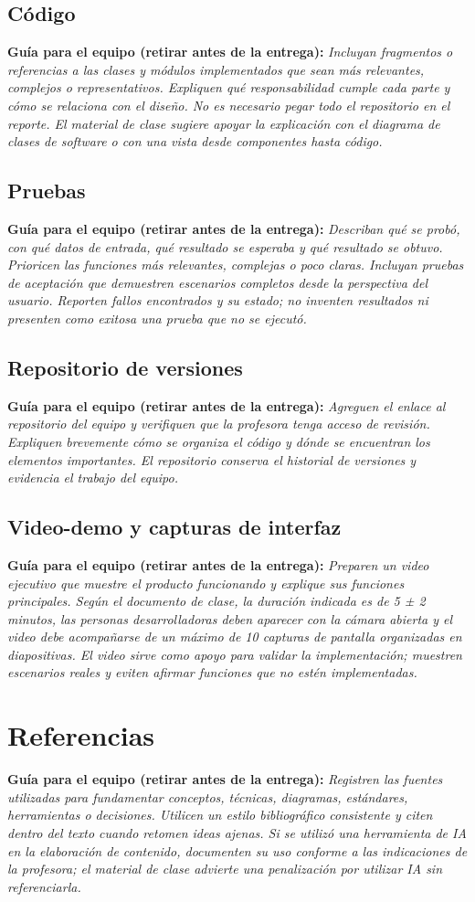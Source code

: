 \documentclass[12pt,letterpaper]{article}
\newcommand{\guia}[1]{\par\smallskip\noindent\textbf{Guía para el equipo (retirar antes de la entrega):} \textit{#1}\par\smallskip}
\begin{document}
\subsection{Código}
\guia{Incluyan fragmentos o referencias a las clases y módulos implementados que sean más relevantes, complejos o representativos. Expliquen qué responsabilidad cumple cada parte y cómo se relaciona con el diseño. No es necesario pegar todo el repositorio en el reporte. El material de clase sugiere apoyar la explicación con el diagrama de clases de software o con una vista desde componentes hasta código.}
\subsection{Pruebas}
\guia{Describan qué se probó, con qué datos de entrada, qué resultado se esperaba y qué resultado se obtuvo. Prioricen las funciones más relevantes, complejas o poco claras. Incluyan pruebas de aceptación que demuestren escenarios completos desde la perspectiva del usuario. Reporten fallos encontrados y su estado; no inventen resultados ni presenten como exitosa una prueba que no se ejecutó.}
\subsection{Repositorio de versiones}
\guia{Agreguen el enlace al repositorio del equipo y verifiquen que la profesora tenga acceso de revisión. Expliquen brevemente cómo se organiza el código y dónde se encuentran los elementos importantes. El repositorio conserva el historial de versiones y evidencia el trabajo del equipo.}
\subsection{Video-demo y capturas de interfaz}
\guia{Preparen un video ejecutivo que muestre el producto funcionando y explique sus funciones principales. Según el documento de clase, la duración indicada es de 5 ± 2 minutos, las personas desarrolladoras deben aparecer con la cámara abierta y el video debe acompañarse de un máximo de 10 capturas de pantalla organizadas en diapositivas. El video sirve como apoyo para validar la implementación; muestren escenarios reales y eviten afirmar funciones que no estén implementadas.}
\section{Referencias}
\guia{Registren las fuentes utilizadas para fundamentar conceptos, técnicas, diagramas, estándares, herramientas o decisiones. Utilicen un estilo bibliográfico consistente y citen dentro del texto cuando retomen ideas ajenas. Si se utilizó una herramienta de IA en la elaboración de contenido, documenten su uso conforme a las indicaciones de la profesora; el material de clase advierte una penalización por utilizar IA sin referenciarla.}
\end{document}
